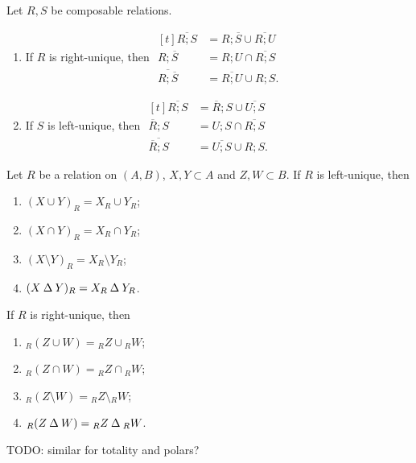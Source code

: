 \begin{lemma} \label{uniquenessResiduals}
Let $R,S$ be composable relations.
\begin{enumerate}
\item If $R$ is right-unique, then $\begin{aligned}[t]
\overline{R;S} &= R;\overline{S} \cup \overline{R;U} \\
R;\overline{S} &= R;U\cap \overline{R;S} \\
\overline{R;\overline{S}} &= \overline{R;U} \cup R;S.
\end{aligned}$
\item If $S$ is left-unique, then $\begin{aligned}[t]
\overline{R;S} &= \overline{R};S \cup \overline{U;S} \\
\overline{R};S &= U;S\cap \overline{R;S} \\
\overline{\overline{R};S} &= \overline{U;S}\cup R;S.
\end{aligned}$
\end{enumerate}
\end{lemma}

\begin{lemma} \label{imagePreimageUniqueness}
Let $R$ be a relation on $(A, B)$, $X,Y\subset A$ and $Z,W\subset B$. If $R$ is left-unique, then
\begin{enumerate}
\item $(X\cup Y)_R = X_R\cup Y_R$;
\item $(X\cap Y)_R = X_R\cap Y_R$;
\item $(X\setminus Y)_R = X_R\setminus Y_R$;
\item $(X\mathbin{\Delta} Y)_R = X_R\mathbin{\Delta} Y_R$.
\end{enumerate}
If $R$ is right-unique, then
\begin{enumerate}
\item $_R(Z\cup W) = {_RZ}\cup {_RW}$;
\item $_R(Z\cap W) = {_RZ}\cap {_RW}$;
\item $_R(Z\setminus W) = {_RZ}\setminus {_RW}$;
\item $_R(Z\mathbin{\Delta} W) = {_RZ}\mathbin{\Delta} {_RW}$.
\end{enumerate}
\end{lemma}
TODO: similar for totality and polars?


